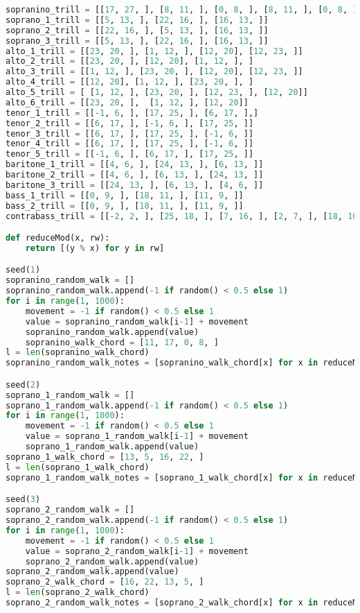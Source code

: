 \begin{lstlisting}[language=Python, caption=Invocation Source Code]
sopranino_trill = [[17, 27, ], [8, 11, ], [0, 8, ], [8, 11, ], [0, 8, ], ]
soprano_1_trill = [[5, 13, ], [22, 16, ], [16, 13, ]]
soprano_2_trill = [[22, 16, ], [5, 13, ], [16, 13, ]]
soprano_3_trill = [[5, 13, ], [22, 16, ], [16, 13, ]]
alto_1_trill = [[23, 20, ], [1, 12, ], [12, 20], [12, 23, ]]
alto_2_trill = [[23, 20, ], [12, 20], [1, 12, ], ]
alto_3_trill = [[1, 12, ], [23, 20, ], [12, 20], [12, 23, ]]
alto_4_trill = [[12, 20], [1, 12, ], [23, 20, ], ]
alto_5_trill = [ [1, 12, ], [23, 20, ], [12, 23, ], [12, 20]]
alto_6_trill = [[23, 20, ],  [1, 12, ], [12, 20]]
tenor_1_trill = [[-1, 6, ], [17, 25, ], [6, 17, ],]
tenor_2_trill = [[6, 17, ], [-1, 6, ], [17, 25, ]]
tenor_3_trill = [[6, 17, ], [17, 25, ], [-1, 6, ]]
tenor_4_trill = [[6, 17, ], [17, 25, ], [-1, 6, ]]
tenor_5_trill = [[-1, 6, ], [6, 17, ], [17, 25, ]]
baritone_1_trill = [[4, 6, ], [24, 13, ], [6, 13, ]]
baritone_2_trill = [[4, 6, ], [6, 13, ], [24, 13, ]]
baritone_3_trill = [[24, 13, ], [6, 13, ], [4, 6, ]]
bass_1_trill = [[0, 9, ], [18, 11, ], [11, 9, ]]
bass_2_trill = [[0, 9, ], [18, 11, ], [11, 9, ]]
contrabass_trill = [[-2, 2, ], [25, 18, ], [7, 16, ], [2, 7, ], [18, 16, ]]

def reduceMod(x, rw):
    return [(y % x) for y in rw]

seed(1)
sopranino_random_walk = []
sopranino_random_walk.append(-1 if random() < 0.5 else 1)
for i in range(1, 1000):
    movement = -1 if random() < 0.5 else 1
    value = sopranino_random_walk[i-1] + movement
    sopranino_random_walk.append(value)
    sopranino_walk_chord = [11, 17, 0, 8, ]
l = len(sopranino_walk_chord)
sopranino_random_walk_notes = [sopranino_walk_chord[x] for x in reduceMod(l, sopranino_random_walk)]

seed(2)
soprano_1_random_walk = []
soprano_1_random_walk.append(-1 if random() < 0.5 else 1)
for i in range(1, 1000):
    movement = -1 if random() < 0.5 else 1
    value = soprano_1_random_walk[i-1] + movement
    soprano_1_random_walk.append(value)
soprano_1_walk_chord = [13, 5, 16, 22, ]
l = len(soprano_1_walk_chord)
soprano_1_random_walk_notes = [soprano_1_walk_chord[x] for x in reduceMod(l, soprano_1_random_walk)]

seed(3)
soprano_2_random_walk = []
soprano_2_random_walk.append(-1 if random() < 0.5 else 1)
for i in range(1, 1000):
    movement = -1 if random() < 0.5 else 1
    value = soprano_2_random_walk[i-1] + movement
    soprano_2_random_walk.append(value)
soprano_2_random_walk.append(value)
soprano_2_walk_chord = [16, 22, 13, 5, ]
l = len(soprano_2_walk_chord)
soprano_2_random_walk_notes = [soprano_2_walk_chord[x] for x in reduceMod(l, soprano_2_random_walk)]


\end{lstlisting}
